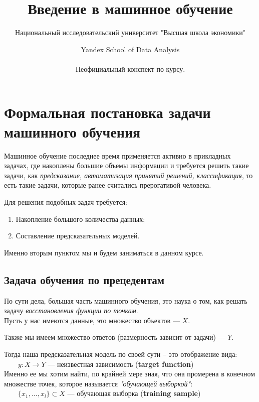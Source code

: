 \documentclass{article}
\title{Введение в машинное обучение}
\author{Национальный исследовательский университет "Высшая школа экономики" \and Yandex School of Data Analysis\\\\
Неофициальный конспект по курсу.}
\begin{document}
\maketitle

\section{Формальная постановка задачи машинного обучения}

Машинное обучение последнее время применяется активно в прикладных задачах, где накоплены большие объемы информации и требуется решить такие задачи, как \textit{предсказание, автоматизация принятий решений, классификация}, то есть такие задачи, которые ранее считались прерогативой человека.

Для решения подобных задач требуется:

\begin{enumerate}
\item Накопление большого количества данных;
\item Составление предсказательных моделей.
\end{enumerate}

Именно вторым пунктом мы и будем заниматься в данном курсе.

\subsection{Задача обучения по прецедентам}

По сути дела, большая часть машинного обучения, это наука о том, как решать задачу \textit{восстановления функции по точкам}.
\\

Пусть у нас имеются данные, это множество объектов --- $X$.

Также мы имеем множество ответов (размерность зависит от задачи) --- $Y$.

Тогда наша предсказательная модель по своей сути -- это отображение вида:
\\

$\qquad y : X \rightarrow Y$ --- неизвестная зависимость (\textbf{target function})
\\

Именно ее мы хотим найти, по крайней мере зная, что она промерена в конечном множестве точек, которое называется \textit{"обучающей выборкой"}:
\\

$\qquad \{x_1, \ldots, x_l\} \subset X$ --- обучающая выборка (\textbf{training sample})
\end{document}

